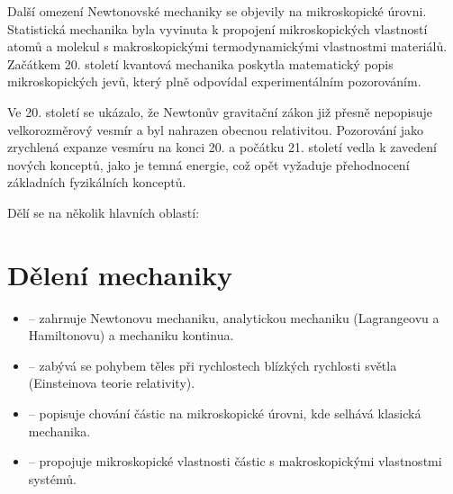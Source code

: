 \documentclass[letterpaper,10pt,english]{jupyterBook}
\begin{document}
\sphinxAtStartPar
Další omezení Newtonovské mechaniky se objevily na mikroskopické úrovni. Statistická mechanika byla vyvinuta k propojení mikroskopických vlastností atomů a molekul s makroskopickými termodynamickými vlastnostmi materiálů. Začátkem 20. století kvantová mechanika poskytla matematický popis mikroskopických jevů, který plně odpovídal experimentálním pozorováním.

\sphinxAtStartPar
Ve 20. století se ukázalo, že Newtonův gravitační zákon již přesně nepopisuje velkorozměrový vesmír a byl nahrazen obecnou relativitou. Pozorování jako zrychlená expanze vesmíru na konci 20. a počátku 21. století vedla k zavedení nových konceptů, jako je temná energie, což opět vyžaduje přehodnocení základních fyzikálních konceptů.

\sphinxAtStartPar
{}

\sphinxAtStartPar
Dělí se na několik hlavních oblastí:


\section{Dělení mechaniky}
\label{\detokenize{Prednasky/0_1_Definice_a_historie_mechaniky:deleni-mechaniky}}\begin{itemize}
\item {} 
\sphinxAtStartPar
{} – zahrnuje Newtonovu mechaniku, analytickou mechaniku (Lagrangeovu a Hamiltonovu) a mechaniku kontinua.

\item {} 
\sphinxAtStartPar
{} – zabývá se pohybem těles při rychlostech blízkých rychlosti světla (Einsteinova teorie relativity).

\item {} 
\sphinxAtStartPar
{} – popisuje chování částic na mikroskopické úrovni, kde selhává klasická mechanika.

\item {} 
\sphinxAtStartPar
{} – propojuje mikroskopické vlastnosti částic s makroskopickými vlastnostmi systémů.

\end{itemize}
\end{document}
